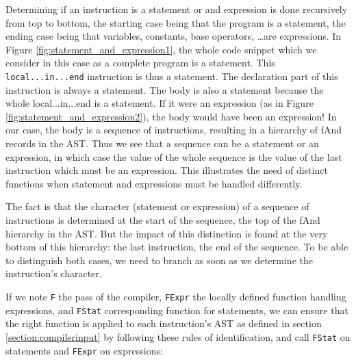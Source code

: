 \documentclass[a4paper]{memoir}
\begin{document}
Determining if an instruction is a statement or and expression is done
recursively from top to bottom, the starting case being that the program is a
statement, the ending case being that variables, constants, base operators,
\ldots are expressions.  In Figure \ref{fig:statement_and_expression1}, the
whole code snippet which we consider in this case as a complete program is a
statement. This \lstinline!local...in...end! instruction is thus a statement.
The declaration part of this instruction is always a statement. The body is
also a statement because the whole local...in...end is a statement. If it were
an expression (as in Figure \ref{fig:statement_and_expression2}), the body
would have been an expression! In our case, the body is a sequence of
instructions, resulting in a hierarchy of fAnd records in the AST. Thus we see that a sequence
can be a statement or an expression, in which case the value
of the whole sequence is the value of the last instruction which must be an expression. This illustrates the
need of distinct functions when statement and expressions must be handled
differently. 

The fact is that the character (statement or
expression) of a sequence of instructions is determined at the start of the
sequence, the top of the fAnd hierarchy in the AST. But the impact of this
distinction is found at the very bottom of this hierarchy: the last
instruction, the end of the sequence. To be able to distinguish both cases, we
need to branch as soon as we determine the instruction's character.

If we note \lstinline!F! the pass of the compiler, \lstinline!FExpr! the locally defined
function handling expressions, and \lstinline!FStat! corresponding function for
statements, we can ensure that the right function is applied to each
instruction's AST as defined in section \ref{section:compilerinput} by following
these rules of identification, and call \lstinline!FStat! on statements and
\lstinline!FExpr! on expressions:
\end{document}
